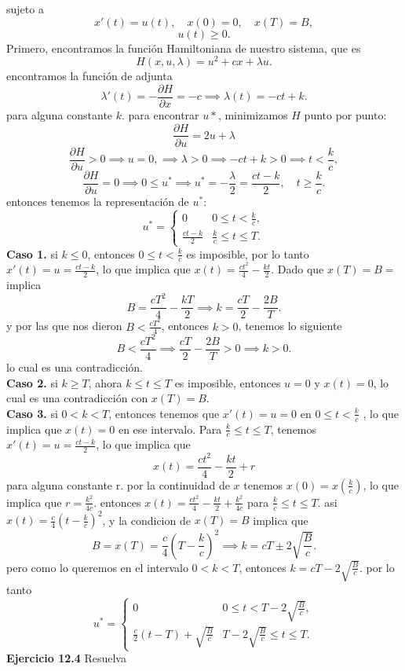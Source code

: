 \documentclass{uofa-eng-assignment}
\begin{document}
sujeto a
\[
x'(t) = u(t), \quad x(0) = 0, \quad x(T) = B,
\]
\[
u(t) \geq 0.
\]
Primero, encontramos la función Hamiltoniana de nuestro sistema, que es
\[H(x, u, \lambda) = u^2 + cx + \lambda u.\]
encontramos la función de adjunta
\[\lambda'(t) = -\frac{\partial H}{\partial x} = -c \implies \lambda(t) = -ct + k.\]
para alguna constante $k$. para encontrar $u*$, minimizamos $H$ punto por punto:
\[\frac{\partial H}{\partial u} = 2u + \lambda\]
\[ 
\frac{ \partial H}{\partial u} >0 \implies u = 0, \implies \lambda > 0 \implies -ct + k > 0 \implies t < \frac{k}{c},
\]
\[
\frac{ \partial H}{\partial u} =0 \implies 0 \leq u^* \implies u^* = -\frac{\lambda}{2} = \frac{ct-k}{2}, \quad t \geq \frac{k}{c}.
\]
entonces tenemos la representación de $u^*$:
\[
u^* = \begin{cases}
0 & 0 \leq t < \frac{k}{c},\\
\frac{ct-k}{2} & \frac{k}{c} \leq t \leq T.
\end{cases}
\]
\textbf{Caso 1.} si $k \leq 0$, entonces $0\leq t < \frac{k}{c}$ es imposible,
por lo tanto $x'(t)=u=\frac{ct-k}{2}$, lo que implica que $x(t) = \frac{ct^2}{4} - \frac{kt}{2}$. 
Dado que $x(T) = B=$ implica 
\[
B= \frac{cT^2}{4}-\frac{kT}{2} \implies k = \frac{cT}{2} - \frac{2B}{T}.
\]
y por las que nos dieron $B < \frac{cT^2}{4}$, entonces $k > 0$, tenemos lo siguiente 
\[
B < \frac{cT^2}{4} \implies \frac{cT}{2} - \frac{2B}{T} > 0 \implies k > 0.
\]
lo cual es una contradicción. \\
\textbf{Caso 2.} si $k\geq T$, ahora $k \leq t \leq T$ es imposible, entonces $u=0$ y $x(t) = 0$, lo cual es una contradicción con $x(T) = B$. \\
\textbf{Caso 3.} si $0 < k < T$, entonces tenemos que $x'(t)=u=0$ en $0 \leq t < \frac{k}{c}$
, lo que implica que $x(t) = 0$ en ese intervalo. 
Para $\frac{k}{c} \leq t \leq T$, tenemos $x'(t) = u = \frac{ct-k}{2}$, lo que implica que
\[x(t) = \frac{ct^2}{4} - \frac{kt}{2}+ r \]
para alguna constante r. por la continuidad de $x$ tenemos $x(0) = x\left(\frac{k}{c}\right)$, lo que implica que $r = \frac{k^2}{4c}$.
entonces $x(t) = \frac{ct^2}{4} - \frac{kt}{2} + \frac{k^2}{4c}$ para $\frac{k}{c} \leq t \leq T$. 
asi $x(t) = \frac{c}{4}(t-\frac{k}{c})^2$, y la condicion de $x(T) = B$ implica que
\[
B= x(T) = \frac{c}{4}\left(T-\frac{k}{c}\right)^2 \implies k = cT \pm 2\sqrt{\frac{B}{c}}. 
\]
pero como lo queremos en el intervalo $0 < k < T$, entonces $k = cT - 2\sqrt{\frac{B}{c}}$.
por lo tanto 
\[
u^* = \begin{cases}
0 & 0 \leq t < T - 2\sqrt{\frac{B}{c}},\\
\frac{c}{2}\left(t - T\right) + \sqrt{\frac{B}{c}} & T - 2\sqrt{\frac{B}{c}} \leq t \leq T.
\end{cases} 
\]
\textbf{Ejercicio 12.4} Resuelva
\end{document}
